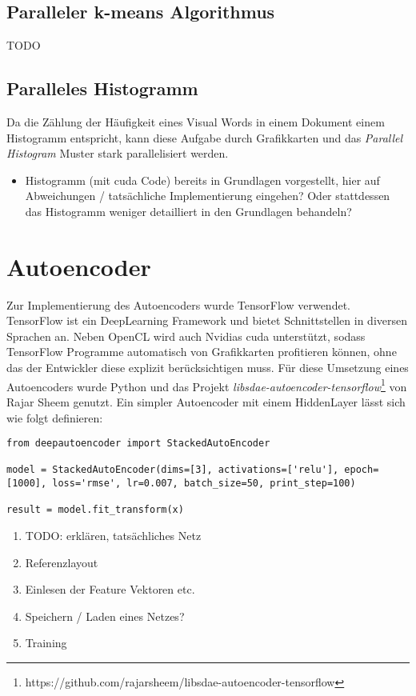 \subsection{Paralleler k-means Algorithmus}

TODO

\subsection{Paralleles Histogramm}

Da die Zählung der Häufigkeit eines Visual Words in einem Dokument einem Histogramm entspricht, kann diese Aufgabe durch Grafikkarten und das \textit{Parallel Histogram} Muster stark parallelisiert werden. 

\begin{itemize}
	\item Histogramm (mit cuda Code) bereits in Grundlagen vorgestellt, hier auf Abweichungen / tatsächliche Implementierung eingehen? Oder stattdessen das Histogramm weniger detailliert in den Grundlagen behandeln? 
\end{itemize}

\section{Autoencoder}

Zur Implementierung des Autoencoders wurde TensorFlow verwendet. TensorFlow ist ein DeepLearning Framework und bietet Schnittstellen in diversen Sprachen an. Neben OpenCL wird auch Nvidias cuda unterstützt, sodass TensorFlow Programme automatisch von Grafikkarten profitieren können, ohne das der Entwickler diese explizit berücksichtigen muss. Für diese Umsetzung eines Autoencoders wurde Python und das Projekt \textit{libsdae-autoencoder-tensorflow}\footnote{https://github.com/rajarsheem/libsdae-autoencoder-tensorflow} von Rajar Sheem genutzt. Ein simpler Autoencoder mit einem HiddenLayer lässt sich wie folgt definieren:

\lstset{language=Python}
\begin{lstlisting}
from deepautoencoder import StackedAutoEncoder

model = StackedAutoEncoder(dims=[3], activations=['relu'], epoch=[1000], loss='rmse', lr=0.007, batch_size=50, print_step=100)
                       
result = model.fit_transform(x)
\end{lstlisting}

\begin{enumerate}
	\item TODO: erklären, tatsächliches Netz
	\item Referenzlayout
	\item Einlesen der Feature Vektoren etc.
	\item Speichern / Laden eines Netzes?
	\item Training
\end{enumerate}